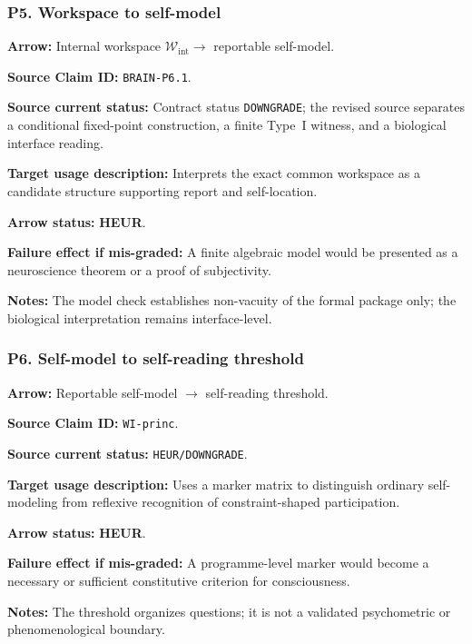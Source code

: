 \documentclass[12pt,a4paper]{article}
\begin{document}
\subsubsection*{P5. Workspace to self-model}
\noindent\textbf{Arrow:} Internal workspace
\(\mathcal W_{\mathrm{int}}\to\) reportable self-model.\par
\noindent\textbf{Source Claim ID:} \texttt{BRAIN-P6.1}.\par
\noindent\textbf{Source current status:} Contract status
\texttt{DOWNGRADE}; the revised source separates a conditional
fixed-point construction, a finite Type~I witness, and a biological
interface reading.\par
\noindent\textbf{Target usage description:} Interprets the exact common
workspace as a candidate structure supporting report and self-location.\par
\noindent\textbf{Arrow status:} \textbf{HEUR}.\par
\noindent\textbf{Failure effect if mis-graded:} A finite algebraic model
would be presented as a neuroscience theorem or a proof of subjectivity.\par
\noindent\textbf{Notes:} The model check establishes non-vacuity of the
formal package only; the biological interpretation remains interface-level.\par

\subsubsection*{P6. Self-model to self-reading threshold}
\noindent\textbf{Arrow:} Reportable self-model \(\to\) self-reading
threshold.\par
\noindent\textbf{Source Claim ID:} \texttt{WI-princ}.\par
\noindent\textbf{Source current status:} \texttt{HEUR/DOWNGRADE}.\par
\noindent\textbf{Target usage description:} Uses a marker matrix to
distinguish ordinary self-modeling from reflexive recognition of
constraint-shaped participation.\par
\noindent\textbf{Arrow status:} \textbf{HEUR}.\par
\noindent\textbf{Failure effect if mis-graded:} A programme-level marker
would become a necessary or sufficient constitutive criterion for
consciousness.\par
\noindent\textbf{Notes:} The threshold organizes questions; it is not a
validated psychometric or phenomenological boundary.\par
\end{document}
